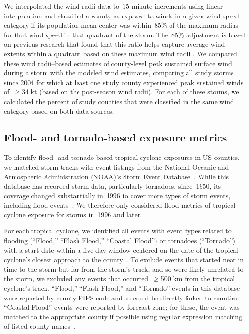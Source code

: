 We interpolated the wind radii data to~15-minute increments using linear
interpolation \parencite{hurricaneexposuredata} and classified a county as
exposed to winds in a given wind speed category if its population mean center
was within~85\% of the maximum radius for that wind speed in that quadrant of
the storm. The~85\% adjustment is based on previous research that found that
this ratio helps capture average wind extents within a quadrant based on these
maximum wind radii \parencite{knaff2016using}.  We compared these wind
radii--based estimates of county-level peak sustained surface wind during a
storm with the modeled wind estimates, comparing all study storms since 2004
for which at least one study county experienced peak sustained winds of~$\ge$34
kt (based on the post-season wind radii). For each of these storms, we
calculated the percent of study counties that were classified in the same wind
category based on both data sources.

\subsection*{Flood- and tornado-based exposure metrics}

To identify flood- and tornado-based tropical cyclone exposures in \ac{US}
counties, we matched storm tracks with event listings from the National Oceanic
and Atmospheric Administration (NOAA)'s Storm Event
Database~\parencite{stormevents}. While this database has recorded storm data,
particularly tornadoes, since~1950, its coverage changed substantially in~1996
to cover more types of storm events, including flood
events~\parencite{stormevents}. We therefore only considered flood metrics of
tropical cyclone exposure for storms in~1996 and later.

For each tropical cyclone, we identified all events with event types related to
flooding (``Flood,'' ``Flash Flood,'' ``Coastal Flood'') or tornadoes
(``Tornado'') with a start date within a five-day window centered on the date
of the tropical cyclone's closest approach to the
county~\parencite{hurricaneexposuredata}. To exclude events that started near
in time to the storm but far from the storm's track, and so were likely
unrelated to the storm, we excluded any events that occurred~$\ge$500
\si{\kilo\metre} from the tropical cyclone's track. ``Flood,'' ``Flash Flood,''
and ``Tornado'' events in this database were reported by county \ac{FIPS} code
and so could be directly linked to counties.  ``Coastal Flood'' events were
reported by forecast zone; for these, the event was matched to the appropriate
county if possible using regular expression matching of listed county
names~\parencite{noaastormevents}. 

